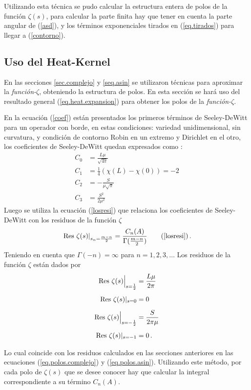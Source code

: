 Utilizando esta técnica se pudo calcular la estructura entera de polos de la función $\zeta (s)$, para calcular la parte finita hay que tener en cuenta la parte angular de (\ref{asd}), y los términos exponenciales tirados en (\ref{eq.tirados}) para llegar a (\ref{contorno}).


\subsection{Uso del Heat-Kernel}

En las secciones \ref{sec.complejo} y \ref{seq.asin} se utilizaron técnicas para aproximar la {\it función-$\zeta$}, obteniendo la estructura de polos. En esta sección se hará uso del resultado general (\ref{eq.heat.expansion}) para obtener los polos de la {\it función-$\zeta$}.

En la ecuación (\ref{coef}) están presentados los primeros términos de Seeley-DeWitt para un operador con borde, en estas condiciones: variedad unidimensional, sin curvatura, y condición de contorno Robin en un extremo y Dirichlet en el otro, los coeficientes de Seeley-DeWitt quedan expresados como :
\begin{equation}
\begin{aligned}
C _0 &=  \frac{L \mu}{\sqrt{4 \pi} }\\
C _1 &=  \frac{1}{4} \left( \chi (L) - \chi (0) \right) =  -2 \\
C _2 &= - \frac{S}{\mu \sqrt{\pi} } \\
C _3 &= \frac{ S ^2 }{2 \mu ^2 }
\end{aligned}
\end{equation}
Luego se utiliza la ecuación (\ref{losresi}) que relaciona los coeficientes de Seeley-DeWitt con los residuos de la función $\zeta$
\begin{equation}
\left. {\rm Res} \ \zeta  (s)  \right| _{s_n= \frac{m - n}{2}} =  
\frac{ C_n  (A) }{ {\Gamma ( \frac{m-n}{2}} ) }
\tag{\ref{losresi}}
\, .
\end{equation}
Teniendo en cuenta que $\Gamma (-n) = \infty$ para $n = 1,2,3, \dots  $ Los residuos de la función $\zeta$ están dados por
\begin{equation}
\begin{aligned}
{\rm Res} \  \zeta  (s)  \Big| _{s=\frac{1}{2}} &= \frac{L \mu}{2 \pi} \\[5pt]
{\rm Res} \  \zeta  (s)  | _{s=0} &= 0 \\[5pt]
{\rm Res} \ \zeta (s) \Big| _{s= - \frac{1}{2}} &= \frac{S}{2 \pi \mu} \\[5pt]
{\rm Res} \  \zeta  (s) | _{s=-1} &= 0 \, . \\[5pt]
\end{aligned}
\end{equation}
Lo cual coincide con los residuos calculados en las secciones anteriores en las ecuaciones (\ref{eq.polos.complejo}) y (\ref{eq.polos.asin}). Utilizando este método, por cada polo de $\zeta (s)$ que se desee conocer hay que calcular la integral correspondiente a su término $C _n (A)$.

